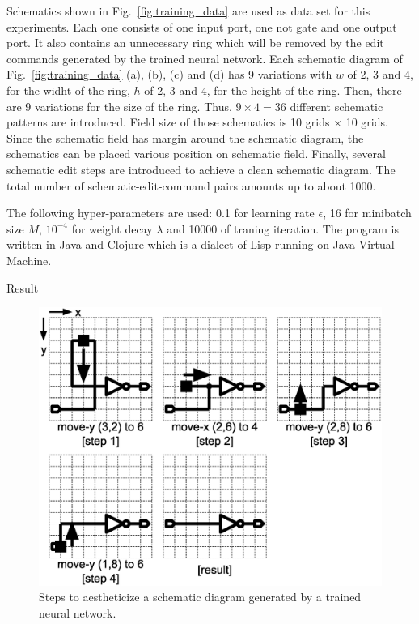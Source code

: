 \documentclass[twocolumn]{article}
\makeatletter
\def\section{\@startsection {section}{1}{\z@}{20pt plus 2pt minus 2pt}
{8pt plus 2pt minus 2pt}{\centering\normalsize\sc
\edef\@svsec{\thesection.\ }}}
\def\thesection{\Roman{section}}
\makeatother
\begin{document}
Schematics shown in Fig.\ \ref{fig:training_data} are used as data set
for this experiments.
Each one consists of one input port, one not gate and one output port.
It also contains an unnecessary ring which will be removed
by the edit commands generated by the trained neural network.
Each schematic diagram of Fig.\ \ref{fig:training_data} (a), (b), (c) and (d)
has 9 variations with
$w$ of 2, 3 and 4, for the widht of the ring,
$h$ of 2, 3 and 4, for the height of the ring.
Then, there are 9 variations for the size of the ring.
Thus, $9 \times 4 = 36$ different schematic patterns are introduced.
Field size of those schematics is 10 grids $\times$ 10 grids.
Since the schematic field has margin around the schematic diagram,
the schematics can be placed various position on schematic field.
Finally, several schematic edit steps are introduced
to achieve a clean schematic diagram.
The total number of schematic-edit-command pairs amounts up to about 1000.

The following hyper-parameters are used:
0.1 for learning rate $\epsilon$,
16 for minibatch size $M$,
$10^{-4}$ for weight decay $\lambda$ and 10000 of traning iteration.
The program is written in Java and Clojure which is
a dialect of Lisp running on Java Virtual Machine.

\section{Result}

\begin{figure}[!tp]
 \begin{center}
  \begin{minipage}{\hsize}
   \includegraphics[width=\hsize]{fig/edit_steps_03.eps}
   \caption{Steps to aestheticize a schematic diagram
            generated by a trained neural network.}
   \label{fig:edit_steps}
  \end{minipage}
 \end{center}
\end{figure}
\end{document}
